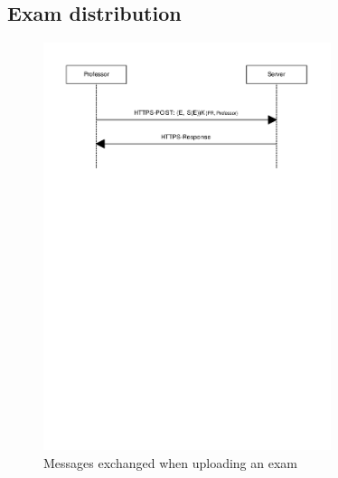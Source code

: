 \documentclass{article}
\begin{document}
\subsection{Exam distribution}
\label{subsec:impl-exams}

\begin{figure}
  \begin{center}
  \includegraphics[width=0.75\textwidth]{images/upload_exam.pdf}
  \caption{Messages exchanged when uploading an exam}
  \label{fig:upload)exam}
  \end{center}
\end{figure}
\end{document}
